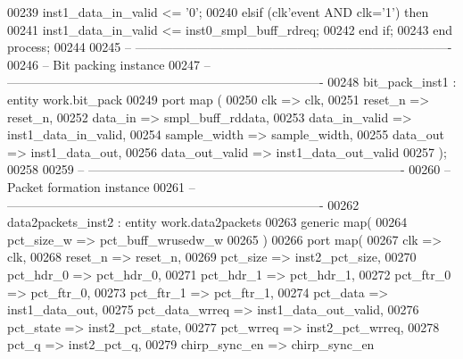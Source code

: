 \begin{DoxyCode}
00239       inst1\_data\_in\_valid <= '0';
00240    \textcolor{keywordflow}{elsif} \textcolor{vhdlchar}{(}\textcolor{vhdlchar}{clk}\textcolor{vhdlchar}{'}\textcolor{vhdlkeyword}{event} \textcolor{keywordflow}{AND} \textcolor{vhdlchar}{clk}\textcolor{vhdlchar}{=}\textcolor{vhdlchar}{'}\textcolor{vhdllogic}{}\textcolor{vhdllogic}{1}\textcolor{vhdlchar}{'}\textcolor{vhdlchar}{)} \textcolor{keywordflow}{then} 
00241       inst1\_data\_in\_valid <= inst0\_smpl\_buff\_rdreq;
00242    \textcolor{keywordflow}{end} \textcolor{keywordflow}{if};
00243 \textcolor{keywordflow}{end} \textcolor{keywordflow}{process};
00244  
00245 \textcolor{keyword}{-- ----------------------------------------------------------------------------}
00246 \textcolor{keyword}{-- Bit packing instance}
00247 \textcolor{keyword}{-- ----------------------------------------------------------------------------        }
00248 bit\_pack\_inst1 : \textcolor{keywordflow}{entity} work.bit_pack
00249   \textcolor{keywordflow}{port} \textcolor{keywordflow}{map} (
00250         clk             => clk,
00251         reset_n         => reset_n,
00252         data_in         => smpl_buff_rddata,
00253         data_in_valid   => inst1_data_in_valid,
00254         sample_width    => sample_width,
00255         data_out        => inst1_data_out,
00256         data_out_valid  => inst1_data_out_valid
00257         \textcolor{vhdlchar}{)};
00258         
00259 \textcolor{keyword}{-- ----------------------------------------------------------------------------}
00260 \textcolor{keyword}{-- Packet formation instance}
00261 \textcolor{keyword}{-- ----------------------------------------------------------------------------        }
00262 data2packets\_inst2 : \textcolor{keywordflow}{entity} work.data2packets
00263    \textcolor{keywordflow}{generic} \textcolor{keywordflow}{map}(
00264       pct_size_w        => pct_buff_wrusedw_w
00265    \textcolor{vhdlchar}{)}
00266    \textcolor{keywordflow}{port} \textcolor{keywordflow}{map}(
00267       clk               => clk,
00268       reset_n           => reset_n,
00269       pct_size          => inst2_pct_size,
00270       pct_hdr_0         => pct_hdr_0,
00271       pct_hdr_1         => pct_hdr_1,
00272         pct_ftr_0         => pct_ftr_0,
00273       pct_ftr_1         => pct_ftr_1,
00274       pct_data          => inst1_data_out,
00275       pct_data_wrreq    => inst1_data_out_valid,
00276       pct_state         => inst2_pct_state,
00277       pct_wrreq         => inst2_pct_wrreq,
00278       pct_q             => inst2_pct_q,
00279         chirp_sync_en       => chirp_sync_en

\end{DoxyCode}
